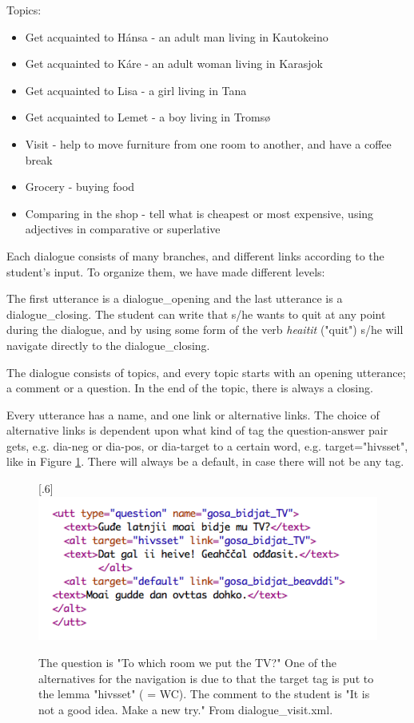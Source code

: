 \documentclass[a4paper,12pt]{article}
\begin{document}
\vspace{0.5cm}
	
Topics:
\begin{itemize}
\item Get acquainted to Hánsa - an adult man living in Kautokeino
\item Get acquainted to Káre - an adult woman living in Karasjok
\item Get acquainted to Lisa - a girl living in Tana
\item Get acquainted to Lemet - a boy living in Tromsø
\item Visit - help to move furniture from one room to another, and have a coffee break
\item Grocery - buying food
\item Comparing in the shop - tell what is cheapest or most expensive, using adjectives in comparative or superlative
\end{itemize}


Each dialogue consists of many branches, and different links according to the student's input. To organize them, we have made different levels:

The first utterance is a dialogue\_opening and the last utterance is a dialogue\_closing. The student can write that s/he wants to quit at any point during the dialogue, and by using some form of the verb \textit{heaitit} ("quit") s/he will navigate directly to the dialogue\_closing.

The dialogue consists of topics, and every topic starts with an opening utterance; a comment or a question. In the end of the topic, there is always a closing.  

Every utterance has a name, and one link or alternative links. The choice of alternative links is dependent upon what kind of tag the question-answer pair gets, e.g. dia-neg or dia-pos, or dia-target to a certain word, e.g. target="hivsset", like in Figure \ref{TV}. There will always be a default, in case there will not be any tag.\\

\begin{figure}[htbp]
\begin{center}
\scalebox{.6}[.6]{\includegraphics{img/gosabidjatTV.png}}
\caption{The question is "To which room we put the TV?" One of the alternatives for the navigation is due to that the target tag is put to the lemma "hivsset" ( = WC). The comment to the student is "It is not a good idea. Make a new try." From dialogue\_visit.xml.}
\label{TV}
\end{center}
\end{figure}
\end{document}
